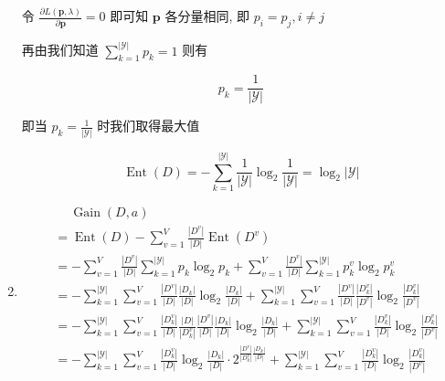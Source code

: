 \documentclass[answers]{exam}  %
\begin{document}
\begin{questions}
\begin{solution}
\begin{enumerate}
            令 $\displaystyle \frac{\partial L(\bm{p}, \lambda)}{\partial \bm{p}} = 0$ 即可知 $\bm{p}$ 各分量相同, 即 $p_{i} = p_{j}, i \neq j$

            再由我们知道 $\displaystyle \sum_{k=1}^{|\mathcal{Y}|}p_k = 1$ 则有

            $$
              p_k = \frac{1}{|\mathcal{Y}|}
            $$

            即当 $\displaystyle p_k = \frac{1}{|\mathcal{Y}|}$ 时我们取得最大值

            $$
              \operatorname{Ent}(D) = -\sum_{k=1}^{|\mathcal{Y}|}\frac{1}{|\mathcal{Y}|}\log_2\frac{1}{|\mathcal{Y}|} = \log_2 |\mathcal{Y}|
            $$

      \item

            $$
              \begin{aligned}
                 & \quad\ \operatorname{Gain}(D, a)                                                                                                                                                                                                                      \\
                 & = \operatorname{Ent}(D) - \sum_{v=1}^{V}\frac{|D^{v}|}{|D|}\operatorname{Ent}(D^{v})                                                                                                                                                                  \\
                 & = -\sum_{v=1}^{V}\frac{|D^{v}|}{|D|}\sum_{k=1}^{|\mathcal{Y}|}p_k\log_2 p_k + \sum_{v=1}^{V}\frac{|D^{v}|}{|D|}\sum_{k=1}^{|\mathcal{Y}|}p_k^{v}\log_2 p_k^{v}                                                                                        \\
                 & = -\sum_{k=1}^{|\mathcal{Y}|}\sum_{v=1}^{V}\frac{|D^{v}|}{|D|}\frac{|D_{k}|}{|D|}\log_2 \frac{|D_{k}|}{|D|} + \sum_{k=1}^{|\mathcal{Y}|}\sum_{v=1}^{V}\frac{|D^{v}|}{|D|}\frac{|D_k^{v}|}{|D^{v}|}\log_2 \frac{|D_k^{v}|}{|D^{v}|}                    \\
                 & = -\sum_{k=1}^{|\mathcal{Y}|}\sum_{v=1}^{V}\frac{|D_k^{v}|}{|D|}\frac{|D|}{|D_k^{v}|}\frac{|D^{v}|}{|D|}\frac{|D_{k}|}{|D|}\log_2 \frac{|D_{k}|}{|D|} + \sum_{k=1}^{|\mathcal{Y}|}\sum_{v=1}^{V}\frac{|D_k^{v}|}{|D|}\log_2 \frac{|D_k^{v}|}{|D^{v}|} \\
                 & = -\sum_{k=1}^{|\mathcal{Y}|}\sum_{v=1}^{V}\frac{|D_k^{v}|}{|D|}\log_2 \frac{|D_{k}|}{|D|}\cdot 2^{\frac{|D^{v}|}{|D_k^{v}|}\frac{|D_{k}|}{|D|}} + \sum_{k=1}^{|\mathcal{Y}|}\sum_{v=1}^{V}\frac{|D_k^{v}|}{|D|}\log_2 \frac{|D_k^{v}|}{|D^{v}|}      \\

\end{aligned}$$
\end{enumerate}
\end{solution}
\end{questions}
\end{document}
